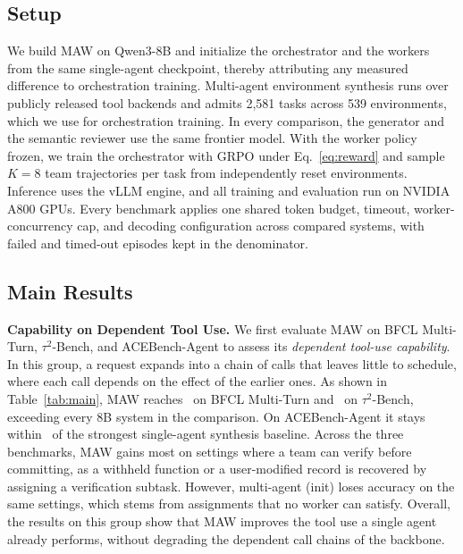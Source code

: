 \subsection{Setup}

We build MAW on Qwen3-8B and initialize the orchestrator and the workers from the same single-agent checkpoint, thereby attributing any measured difference to orchestration training.
Multi-agent environment synthesis runs over publicly released tool backends and admits 2,581 tasks across 539 environments, which we use for orchestration training.
In every comparison, the generator and the semantic reviewer use the same frontier model.
With the worker policy frozen, we train the orchestrator with GRPO under Eq.~\ref{eq:reward} and sample $K=8$ team trajectories per task from independently reset environments.
Inference uses the vLLM engine, and all training and evaluation run on NVIDIA A800 GPUs.
Every benchmark applies one shared token budget, timeout, worker-concurrency cap, and decoding configuration across compared systems, with failed and timed-out episodes kept in the denominator.



\subsection{Main Results}

\textbf{Capability on Dependent Tool Use.}\quad
We first evaluate MAW on BFCL Multi-Turn, $\tau^2$-Bench, and ACEBench-Agent to assess its \emph{dependent tool-use capability}.
In this group, a request expands into a chain of calls that leaves little to schedule, where each call depends on the effect of the earlier ones.
As shown in Table~\ref{tab:main}, MAW reaches \fillin\ on BFCL Multi-Turn and \fillin\ on $\tau^2$-Bench, exceeding every 8B system in the comparison.
On ACEBench-Agent it stays within \fillin\ of the strongest single-agent synthesis baseline.
Across the three benchmarks, MAW gains most on settings where a team can verify before committing, as a withheld function or a user-modified record is recovered by assigning a verification subtask.
However, multi-agent (init) loses accuracy on the same settings, which stems from assignments that no worker can satisfy.
Overall, the results on this group show that MAW improves the tool use a single agent already performs, without degrading the dependent call chains of the backbone.

